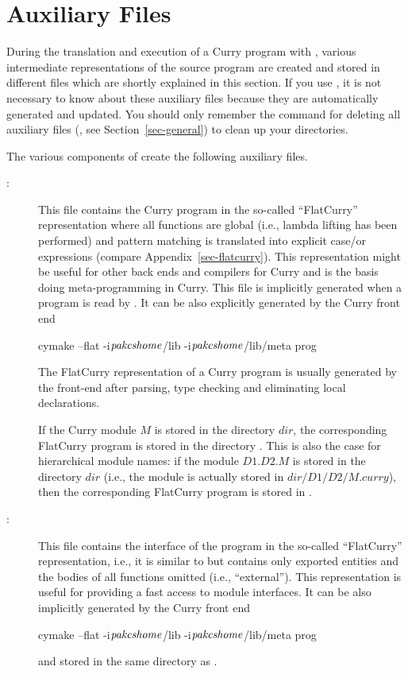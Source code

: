 \section{Auxiliary Files}
\label{sec-auxfiles}

During the translation and execution of a Curry program with \CYS,
various intermediate representations of the source program are created
and stored in different files which are shortly explained in this section.
If you use \CYS, it is not necessary to know about
these auxiliary files because they are automatically generated
and updated. You should only remember the command for deleting
all auxiliary files (, see Section~\ref{sec-general})
to clean up your directories.

The various components of \CYS create the following auxiliary files.
\begin{description}
\item[:] This file contains the Curry program
in the so-called ``FlatCurry'' representation where all functions are global
(i.e., lambda lifting has been performed) and pattern matching
is translated into explicit case/or expressions
(compare Appendix~\ref{sec-flatcurry}).
This representation might be useful for other back ends and
compilers for Curry and is the basis doing meta-programming in Curry.
This file is implicitly
generated when a program is read by \CYS.
It can be also explicitly generated by the Curry front end
\begin{curry}
cymake --flat -i$\mbox{\textit{pakcshome}}$/lib -i$\mbox{\textit{pakcshome}}$/lib/meta prog
\end{curry}
The FlatCurry representation of a Curry program is usually
generated by the front-end after parsing, type checking and eliminating
local declarations.

If the Curry module $M$ is stored in the directory $dir$,
the corresponding FlatCurry program is stored in the directory
.
This is also the case for hierarchical module names:
if the module $D1.D2.M$ is stored in the directory $dir$
(i.e., the module is actually stored in $dir/D1/D2/M.curry$),
then the corresponding FlatCurry program is stored in
.

\item[:] This file contains the interface
of the program in the so-called ``FlatCurry'' representation,
i.e., it is similar to  but contains only exported
entities and the bodies of all functions omitted (i.e., ``external'').
This representation is useful for providing a fast access
to module interfaces.
It can be also implicitly generated by the Curry front end
\begin{curry}
cymake --flat -i$\mbox{\textit{pakcshome}}$/lib -i$\mbox{\textit{pakcshome}}$/lib/meta prog
\end{curry}
and stored in the same directory as .


\end{description}

